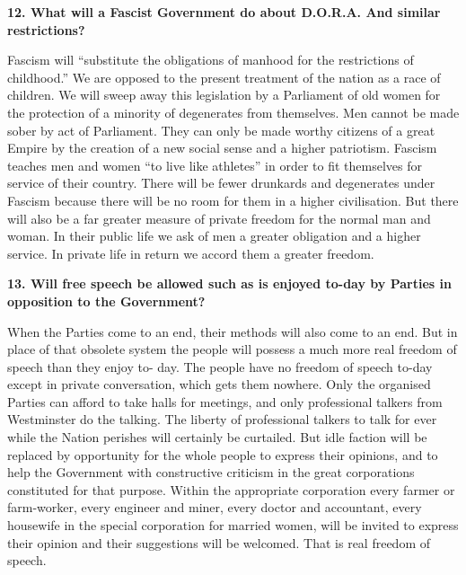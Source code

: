 \documentclass{book}
\begin{document}
\begin{flushleft}
\textbf{12. What will a Fascist Government do about D.O.R.A. And similar restrictions?}

Fascism will ``substitute the obligations of manhood for the restrictions of childhood.'' We are
opposed to the present treatment of the nation as a race of children. We will sweep away this
legislation by a Parliament of old women for the protection of a minority of degenerates from
themselves. Men cannot be made sober by act of Parliament. They can only be made worthy
citizens of a great Empire by the creation of a new social sense and a higher patriotism. Fascism
teaches men and women ``to live like athletes'' in order to fit themselves for service of their
country. There will be fewer drunkards and degenerates under Fascism because there will be no
room for them in a higher civilisation. But there will also be a far greater measure of private
freedom for the normal man and woman. In their public life we ask of men a greater obligation and a higher service. In private life in return
we accord them a greater freedom.
\end{flushleft}
\begin{flushright}
\textbf{13. Will free speech be allowed such as is enjoyed to-day
    by Parties in opposition to the Government?}

When the Parties come to an end, their methods will also come to an end. But in place of that
obsolete system the people will possess a much more real freedom of speech than they enjoy to-
day. The people have no freedom of speech to-day except in private conversation, which gets
them nowhere. Only the organised Parties can afford to take halls for meetings, and only
professional talkers from Westminster do the talking. The liberty of professional talkers to talk
for ever while the Nation perishes will certainly be curtailed. But idle faction will be replaced by
opportunity for the whole people to express their opinions, and to help the Government with
constructive criticism in the great corporations constituted for that purpose. Within the
appropriate corporation every farmer or farm-worker, every engineer and miner, every doctor
and accountant, every housewife in the special corporation for married women, will be invited to
express their opinion and their suggestions will be welcomed. That is real freedom of speech.
\end{flushright}
\end{document}

